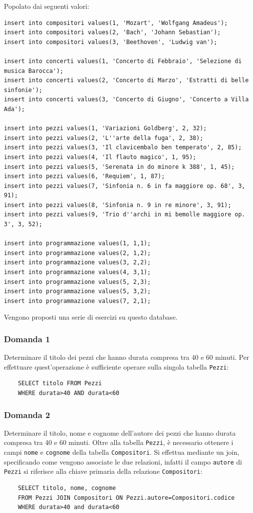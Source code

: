 \documentclass{article}
\begin{document}
Popolato dai seguenti valori:
\begin{verbatim}
insert into compositori values(1, 'Mozart', 'Wolfgang Amadeus');
insert into compositori values(2, 'Bach', 'Johann Sebastian');
insert into compositori values(3, 'Beethoven', 'Ludwig van');

insert into concerti values(1, 'Concerto di Febbraio', 'Selezione di musica Barocca');
insert into concerti values(2, 'Concerto di Marzo', 'Estratti di belle sinfonie');
insert into concerti values(3, 'Concerto di Giugno', 'Concerto a Villa Ada');

insert into pezzi values(1, 'Variazioni Goldberg', 2, 32);
insert into pezzi values(2, 'L''arte della fuga', 2, 38);
insert into pezzi values(3, 'Il clavicembalo ben temperato', 2, 85);
insert into pezzi values(4, 'Il flauto magico', 1, 95);
insert into pezzi values(5, 'Serenata in do minore k 388', 1, 45);
insert into pezzi values(6, 'Requiem', 1, 87);
insert into pezzi values(7, 'Sinfonia n. 6 in fa maggiore op. 68', 3, 91);
insert into pezzi values(8, 'Sinfonia n. 9 in re minore', 3, 91);
insert into pezzi values(9, 'Trio d''archi in mi bemolle maggiore op. 3', 3, 52);

insert into programmazione values(1, 1,1);
insert into programmazione values(2, 1,2);
insert into programmazione values(3, 2,2);
insert into programmazione values(4, 3,1);
insert into programmazione values(5, 2,3);
insert into programmazione values(5, 3,2);
insert into programmazione values(7, 2,1);
\end{verbatim}

Vengono proposti una serie di esercizi su questo database. 

\subsubsection*{Domanda 1}
Determinare il titolo dei pezzi che hanno durata compresa tra 40 e 60 minuti. Per effettuare quest'operazione è sufficiente operare sulla singola tabella \verb|Pezzi|:
\begin{verbatim}
    SELECT titolo FROM Pezzi
    WHERE durata>40 AND durata<60
\end{verbatim}

\subsubsection*{Domanda 2}
Determinare il titolo, nome e cognome dell'autore dei pezzi che hanno durata compresa tra 40 e 60 minuti. Oltre alla tabella \verb|Pezzi|, è necessario ottenere i campi 
\verb|nome| e \verb|cognome| della tabella \verb|Compositori|. Si effettua mediante un join, specificando come vengono associate le due relazioni, infatti il campo \verb|autore| 
di \verb|Pezzi| si riferisce alla chiave primaria della relazione \verb|Compositori|:
\begin{verbatim}
    SELECT titolo, nome, cognome  
    FROM Pezzi JOIN Compositori ON Pezzi.autore=Compositori.codice
    WHERE durata>40 and durata<60
\end{verbatim}
\end{document}
